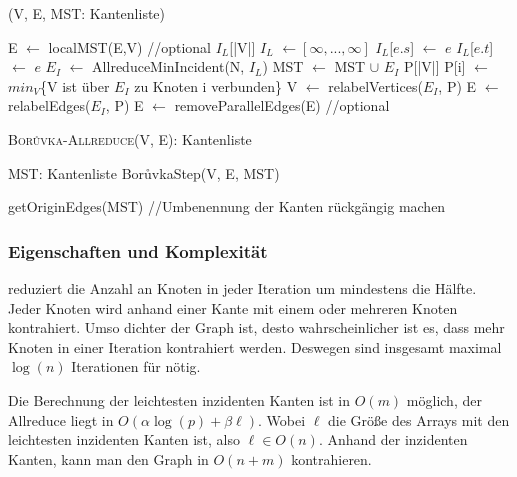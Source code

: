 \begin{algorithm} 
\caption{\boruvkaStep(V, E, MST: Kantenliste)}
\begin{algorithmic}[1]
\label{BoruvkaStep}

\STATE E $\leftarrow$ localMST(E,V) //optional
\STATE $I_L$[|V|]
\STATE $I_L$ $\gets [\infty, ..., \infty]$ 
 \label{Incident-start}
        \STATE $I_L$[$e.s$] $\gets$ $e$
    \ENDIF
        \STATE $I_L$[$e.t$] $\gets$ $e$
    \ENDIF
\ENDFOR \label{Incident-end}
\STATE $E_I$ $\leftarrow$ AllreduceMinIncident(N, $I_L$) \label{Allreduce-code}
 \label{addMST-start}
    \STATE MST $\gets$ MST $\cup$ $E_I$ 
\ENDIF \label{addMST-end}
\STATE P[|V|]
 \label{parent-start}
    \STATE P[i] $\gets$ $min_V$\{V ist über $E_I$ zu Knoten i verbunden\}
\ENDFOR \label{parent-end}
\STATE V $\gets$ relabelVertices($E_I$, P) \label{kontrahiere-start}
\STATE E $\gets$ relabelEdges($E_I$, P)\label{kontrahiere-end}
\STATE E $\gets$ removeParallelEdges(E) //optional \label{removeParallel-code}
\end{algorithmic}
\end{algorithm}



\begin{algorithm} 
\caption{\textsc{Bor{\r u}vka-Allreduce}(V, E): Kantenliste}
\begin{algorithmic}[1]
\label{Boruvka-Allreduce-Algo}

\STATE MST: Kantenliste
    \STATE Bor{\r u}vkaStep(V, E, MST)
\ENDWHILE

\RETURN getOriginEdges(MST) //Umbenennung der Kanten rückgängig machen
\end{algorithmic}
\end{algorithm}


\subsubsection{Eigenschaften und Komplexität}
\boruvkaAllreduce reduziert die Anzahl an Knoten in jeder Iteration um mindestens die Hälfte.
Jeder Knoten wird anhand einer Kante mit einem oder mehreren Knoten kontrahiert. Umso dichter der Graph ist, desto wahrscheinlicher ist es, dass mehr Knoten in einer Iteration kontrahiert werden.
Deswegen sind insgesamt maximal $\log(n)$ Iterationen für \boruvkaAllreduce nötig.

Die Berechnung der leichtesten inzidenten Kanten ist in $O(m)$ möglich, der Allreduce liegt in $O(\alpha \log(p)+\beta \ell)$. Wobei $\ell$ die Größe des Arrays mit den leichtesten inzidenten Kanten ist, also $\ell \in O(n)$.
Anhand der inzidenten Kanten, kann man den Graph in $O(n + m)$ kontrahieren.


